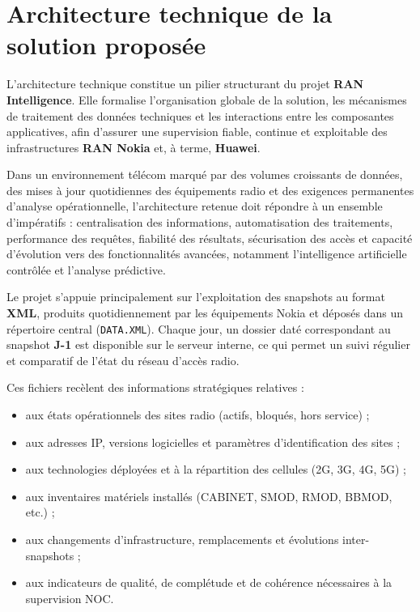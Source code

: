 \documentclass[12pt,a4paper]{report}
\begin{document}
\section{Architecture technique de la solution proposée}\label{sec:ch2-archi}

\begin{flushleft}

L'architecture technique constitue un pilier structurant du projet \textbf{RAN Intelligence}. Elle formalise l'organisation globale de la solution, les mécanismes de traitement des données techniques et les interactions entre les composantes applicatives, afin d'assurer une supervision fiable, continue et exploitable des infrastructures \textbf{RAN Nokia} et, à terme, \textbf{Huawei}.

Dans un environnement télécom marqué par des volumes croissants de données, des mises à jour quotidiennes des équipements radio et des exigences permanentes d'analyse opérationnelle, l'architecture retenue doit répondre à un ensemble d'impératifs : centralisation des informations, automatisation des traitements, performance des requêtes, fiabilité des résultats, sécurisation des accès et capacité d'évolution vers des fonctionnalités avancées, notamment l'intelligence artificielle contrôlée et l'analyse prédictive.

Le projet s'appuie principalement sur l'exploitation des snapshots au format \textbf{XML}, produits quotidiennement par les équipements Nokia et déposés dans un répertoire central (\texttt{DATA.XML}). Chaque jour, un dossier daté correspondant au snapshot \textbf{J-1} est disponible sur le serveur interne, ce qui permet un suivi régulier et comparatif de l'état du réseau d'accès radio.

Ces fichiers recèlent des informations stratégiques relatives :

\begin{itemize}
    \item aux états opérationnels des sites radio (actifs, bloqués, hors service) ;
    \item aux adresses IP, versions logicielles et paramètres d'identification des sites ;
    \item aux technologies déployées et à la répartition des cellules (2G, 3G, 4G, 5G) ;
    \item aux inventaires matériels installés (CABINET, SMOD, RMOD, BBMOD, etc.) ;
    \item aux changements d'infrastructure, remplacements et évolutions inter-snapshots ;
    \item aux indicateurs de qualité, de complétude et de cohérence nécessaires à la supervision NOC.
\end{itemize}


\end{flushleft}
\end{document}
